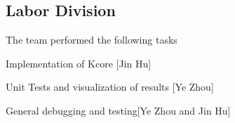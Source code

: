 
\subsection{Labor Division}

The team performed the following tasks
\bit
\item Implementation of Kcore [Jin Hu]
\item Unit Tests and visualization of results [Ye Zhou]
\item General debugging and testing[Ye Zhou and Jin Hu]
\eit
